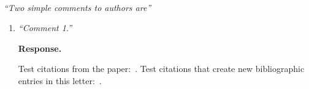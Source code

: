 \documentclass[11pt]{article}
\begin{document}
~\\[.1cm]
\noindent\emph{``Two simple comments to authors are''}
\begin{enumerate}[label=R1.\arabic*] %

    \item {\it ``Comment 1.''}

          {\bf Response.}
          \begin{bullets}
              Test citations from the paper:~\cite{P-kay1}.
              Test citations that create new bibliographic entries in this letter:~\cite{wilson2009regularization,wilson2010tomography}.

          \end{bullets}

          \begin{bullets}

              \begin{bullets}

                  \begin{bullets}

                      \begin{bullets}

                          \begin{bullets}

                              \begin{bullets}

                                  \begin{bullets}

                                      \begin{bullets}

                                          \begin{bullets}
                                          \end{bullets}

                                      \end{bullets}

                                  \end{bullets}


\end{bullets}
\end{bullets}
\end{bullets}
\end{bullets}
\end{bullets}
\end{bullets}
\end{enumerate}
\end{document}
